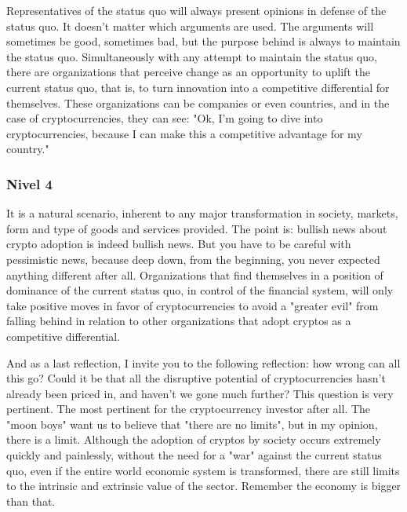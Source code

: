Representatives of the status quo will always present opinions in defense of the status quo. It doesn't matter which arguments are used. The arguments will sometimes be good, sometimes bad, but the purpose behind is always to maintain the status quo. Simultaneously with any attempt to maintain the status quo, there are organizations that perceive change as an opportunity to uplift the current status quo, that is, to turn innovation into a competitive differential for themselves. These organizations can be companies or even countries, and in the case of cryptocurrencies, they can see: "Ok, I'm going to dive into cryptocurrencies, because I can make this a competitive advantage for my country."

\subsubsection{Nivel 4}
It is a natural scenario, inherent to any major transformation in society, markets, form and type of goods and services provided. The point is: bullish news about crypto adoption is indeed bullish news. But you have to be careful with pessimistic news, because deep down, from the beginning, you never expected anything different after all. Organizations that find themselves in a position of dominance of the current status quo, in control of the financial system, will only take positive moves in favor of cryptocurrencies to avoid a "greater evil" from falling behind in relation to other organizations that adopt cryptos as a competitive differential.

And as a last reflection, I invite you to the following reflection: how wrong can all this go? Could it be that all the disruptive potential of cryptocurrencies hasn't already been priced in, and haven't we gone much further? This question is very pertinent. The most pertinent for the cryptocurrency investor after all. The "moon boys" want us to believe that "there are no limits", but in my opinion, there is a limit. Although the adoption of cryptos by society occurs extremely quickly and painlessly, without the need for a "war" against the current status quo, even if the entire world economic system is transformed, there are still limits to the intrinsic and extrinsic value of the sector. Remember the economy is bigger than that.

